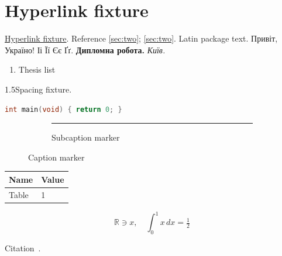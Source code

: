 \documentclass{article}
\begin{document}
\tableofcontents
\section{Hyperlink fixture}\label{sec:one}
\href{https://example.invalid/}{Hyperlink fixture}. Reference \ref{sec:two}; \cref{sec:two}.
\ifPDFTeX Latin package text.\else
Привіт, Україно! Іі Її Єє Ґґ. \textbf{Дипломна робота.} \textit{Київ.}
\fi
\begin{enumerate}[label=\alph*)]\item Thesis list\end{enumerate}
\begin{spacing}{1.5}Spacing fixture.\end{spacing}
\begin{lstlisting}[language=C,caption={Listing marker}]
int main(void) { return 0; }
\end{lstlisting}
\begin{figure}[h]
\begin{subfigure}{.4\linewidth}\rule{1cm}{1cm}\caption{Subcaption marker}\end{subfigure}
\caption{Caption marker}
\end{figure}
\begin{longtable}{ll}\toprule Name & Value\\\midrule Table & 1\\\bottomrule\end{longtable}
\[\mathbb{R}\ni x,\quad \int_0^1 x\,dx=\tfrac12\]

Citation~\cite{reference2}.

\end{document}
